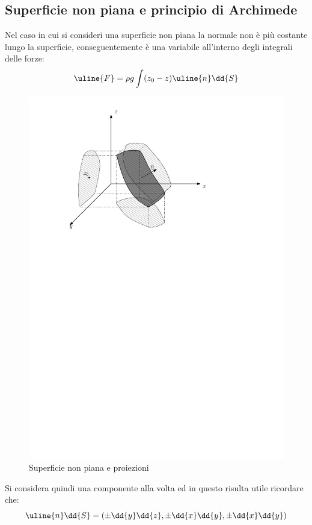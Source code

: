 \subsection{Superficie non piana e principio di Archimede}
Nel caso in cui si consideri una superficie non piana la normale non è più costante lungo la superficie, conseguentemente è una variabile all'interno degli integrali delle forze:
	\begin{equation*}
		\uline{F} = \rho g \int (z_0 -z) \uline{n} \dd{S}
	\end{equation*}
%
	\begin{figure}[ht]
		\includegraphics[scale=1.10]{./2.4 Spinte sulle superfici/2.4-5}
		\centering
		\caption{Superficie non piana e proiezioni}
	\end{figure}	
Si considera quindi una componente alla volta ed in questo risulta utile ricordare che:
	\begin{equation*}
		\uline{n} \dd{S} = (\pm \dd{y} \dd{z}, \pm \dd{x} \dd{y}, \pm \dd{x} \dd{y})
	\end{equation*}
